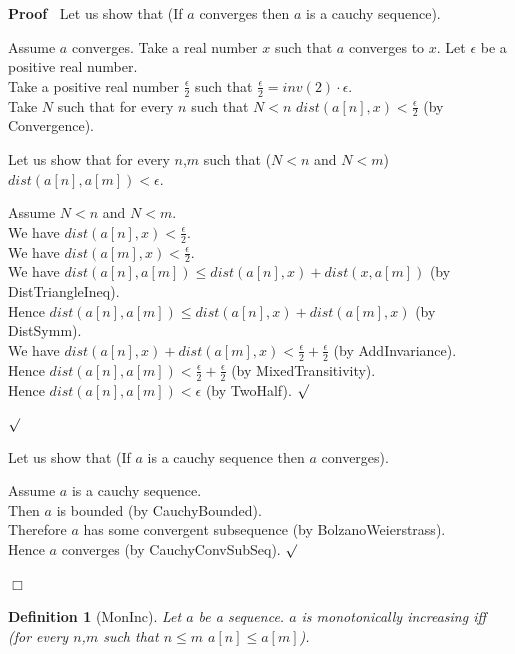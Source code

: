 \documentclass{article}
\newenvironment{forthel}{\begin{leftbar}}{\end{leftbar}}
\newenvironment{proof}{\noindent\textbf{Proof\ }}{\hspace*{\fill}$\Box$\medskip}
\newenvironment{subproof}{\begin{list}{}{}
		\item[\text{Proof}]}{\hfill $\surd$ \end{list}}
\newtheorem{definition}{Definition}
\newcommand{\halfeps}{\frac{\epsilon}{2}}
\begin{document}
\begin{forthel}
	\begin{proof}
		Let us show that (If $a$ converges then $a$ is a cauchy sequence).
		\begin{subproof}
			Assume $a$ converges.
			Take a real number $x$ such that $a$ converges to $x$.
			Let $\epsilon$ be a positive real number.\\
			Take a positive real number $\halfeps$ such that $\halfeps = inv(2) \cdot \epsilon$.\\
			Take $N$ such that for every $n$ such that $N < n$ $dist(a[n],x) < \halfeps$ (by Convergence).
			
			Let us show that for every $n$,$m$ such that ($N < n$ and $N < m$) $dist(a[n],a[m]) < \epsilon$.
			\begin{subproof}
				Assume $N < n$ and $N < m$.\\
				We have $dist(a[n],x) < \halfeps$.\\
				We have $dist(a[m],x) < \halfeps$.\\
				We have $dist(a[n],a[m]) \leq dist(a[n],x) + dist(x,a[m])$ (by DistTriangleIneq).\\
				Hence $dist(a[n],a[m]) \leq dist(a[n],x) + dist(a[m],x)$ (by DistSymm).\\
				We have $dist(a[n],x) + dist(a[m],x) < \halfeps + \halfeps$ (by AddInvariance).\\
				Hence $dist(a[n],a[m]) < \halfeps + \halfeps$ (by MixedTransitivity).\\
				Hence $dist(a[n],a[m]) < \epsilon$ (by TwoHalf).
			\end{subproof}
		\end{subproof}
		
		Let us show that (If $a$ is a cauchy sequence then $a$ converges).
		\begin{subproof}
			Assume $a$ is a cauchy sequence.\\
			Then $a$ is bounded (by CauchyBounded).\\
			Therefore $a$ has some convergent subsequence (by BolzanoWeierstrass).\\
			Hence $a$ converges (by CauchyConvSubSeq).
		\end{subproof}
	\end{proof}
	
	
	\begin{definition}[MonInc]
		Let $a$ be a sequence. $a$ is monotonically increasing iff (for every $n$,$m$ such that $n \leq m$ $a[n] \leq a[m]$).
	\end{definition}
	

\end{forthel}
\end{document}
